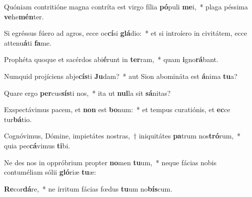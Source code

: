 \item Quóniam contritióne magna contríta est virgo fília \textbf{pó}puli \textbf{me}i,~* plaga péssima \textbf{ve}he\textbf{mén}ter.
\item Si egréssus fúero ad agros, ecce oc\textbf{cí}si \textbf{glá}dio:~* et si introíero in civitátem, ecce attenu\textbf{á}ti \textbf{fa}me.
\item Prophéta quoque et sacérdos abi\textbf{é}runt in \textbf{ter}ram,~* quam \textbf{i}gno\textbf{rá}bant.
\item Numquid projíciens abje\textbf{cís}ti \textbf{Ju}dam?~* aut Sion abomináta est \textbf{á}nima \textbf{tu}a?
\item Quare ergo \textbf{per}cus\textbf{sís}ti nos,~* ita ut \textbf{nul}la sit \textbf{sá}nitas?
\item Exspectávimus pacem, et \textbf{non} est \textbf{bo}num:~* et tempus curatiónis, et \textbf{ec}ce tur\textbf{bá}tio.
\item Cognóvimus, Dómine, impietátes nostras,~† iniquitátes \textbf{pa}trum nos\textbf{tró}rum,~* quia pec\textbf{cá}vimus \textbf{ti}bi.
\item Ne des nos in oppróbrium propter \textbf{no}men \textbf{tu}um,~* neque fácias nobis contuméliam sólii \textbf{gló}riæ \textbf{tu}æ:
\item \textbf{Re}cor\textbf{dá}re,~* ne írritum fácias fœdus \textbf{tu}um no\textbf{bís}cum.
